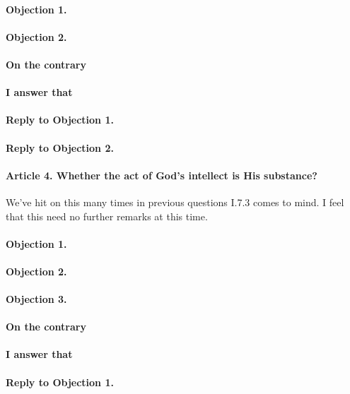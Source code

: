 \documentclass{ucetd}
\begin{document}
\paragraph{Objection 1.}
\paragraph{Objection 2.}
\paragraph{On the contrary}
\paragraph{I answer that}
\paragraph{Reply to Objection 1.}
\paragraph{Reply to Objection 2.}

\paragraph{Article 4. Whether the act of God's intellect is His substance?}
We've hit on this many times in previous questions I.7.3 comes to mind. I feel that this need no further remarks at this time.
\paragraph{Objection 1.}
\paragraph{Objection 2.}
\paragraph{Objection 3.}
\paragraph{On the contrary}
\paragraph{I answer that}
\paragraph{Reply to Objection 1.}
\end{document}
